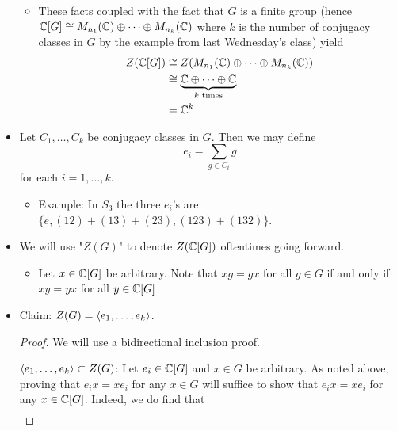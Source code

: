 \documentclass[../notes.tex]{subfiles}
\begin{document}
\begin{itemize}
\begin{itemize}
        \item These facts coupled with the fact that $G$ is a finite group (hence $\mathbb{C}[G]\cong M_{n_1}(\mathbb{C})\oplus\cdots\oplus M_{n_k}(\mathbb{C})$ where $k$ is the number of conjugacy classes in $G$ by the example from last Wednesday's class) yield
        \begin{align*}
            Z(\mathbb{C}[G]) &\cong Z(M_{n_1}(\mathbb{C})\oplus\cdots\oplus M_{n_k}(\mathbb{C}))\\
            &\cong \underbrace{\mathbb{C}\oplus\cdots\oplus\mathbb{C}}_{k\text{ times}}\\
            &= \mathbb{C}^k
        \end{align*}
    \end{itemize}
    \item Let $C_1,\dots,C_k$ be conjugacy classes in $G$. Then we may define
    \begin{equation*}
        e_i = \sum_{g\in C_i}g
    \end{equation*}
    for each $i=1,\dots,k$.
    \begin{itemize}
        \item Example: In $S_3$ the three $e_i$'s are $\{e,(12)+(13)+(23),(123)+(132)\}$.
    \end{itemize}
    \item We will use "$Z(G)$" to denote $Z(\mathbb{C}[G])$ oftentimes going forward.
    \begin{itemize}
        \item Let $x\in\mathbb{C}[G]$ be arbitrary. Note that $xg=gx$ for all $g\in G$ if and only if $xy=yx$ for all $y\in\mathbb{C}[G]$.
    \end{itemize}
    \item Claim: $Z(G)=\left\langle{e_1,\dots,e_k}\right\rangle$.
    \begin{proof}
        We will use a bidirectional inclusion proof.\par
        \underline{$\left\langle{e_1,\dots,e_k}\right\rangle\subset Z(G)$}: Let $e_i\in\mathbb{C}[G]$ and $x\in G$ be arbitrary. As noted above, proving that $e_ix=xe_i$ for any $x\in G$ will suffice to show that $e_ix=xe_i$ for any $x\in\mathbb{C}[G]$. Indeed, we do find that
        \begin{align*}

\end{align*}
\end{proof}
\end{itemize}
\end{document}
